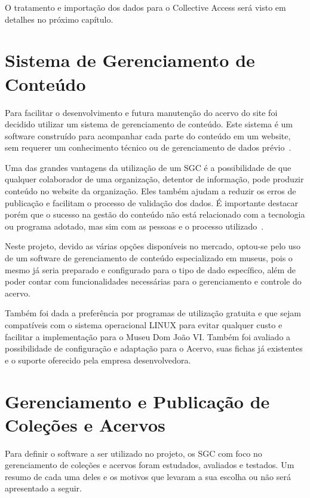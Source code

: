 \documentclass[a4paper,12pt,oneside,onecolumn,final,fleqn]{repUERJ}
\begin{document}
O tratamento e importação dos dados para o Collective Access será visto em detalhes no próximo capítulo.

\section{Sistema de Gerenciamento de Conteúdo}

Para facilitar o desenvolvimento e futura manutenção do acervo do site foi decidido utilizar um sistema de gerenciamento de conteúdo. Este sistema é um software construído para acompanhar cada parte do conteúdo em um website, sem requerer um conhecimento técnico ou de gerenciamento de dados prévio~\cite{CMS}.

Uma das grandes vantagens da utilização de um SGC é a possibilidade de que qualquer colaborador de uma organização, detentor de informação, pode produzir conteúdo no website da organização. Eles também ajudam a reduzir os erros de publicação e facilitam o processo de validação dos dados. É importante destacar porém que o sucesso na gestão do conteúdo não está relacionado com a tecnologia ou programa adotado, mas sim com as pessoas e o processo utilizado~\cite{chagas2018estudo}.


Neste projeto, devido as várias opções disponíveis no mercado, optou-se pelo uso de um software de gerenciamento de conteúdo especializado em museus, pois o mesmo já seria preparado e configurado para o tipo de dado específico, além de poder contar com funcionalidades necessárias para o gerenciamento e controle do acervo.

Também foi dada a preferência por programas de utilização gratuita e que sejam compatíveis com o sistema operacional LINUX para evitar qualquer custo e facilitar a implementação para o Museu Dom João VI. Também foi avaliado a possibilidade de configuração e adaptação para o Acervo, suas fichas já existentes e o suporte oferecido pela empresa desenvolvedora.

\section{Gerenciamento e Publicação de Coleções e Acervos}

Para definir o software a ser utilizado no projeto, os SGC com foco no gerenciamento de coleções e acervos foram estudados, avaliados e testados. Um resumo de cada uma deles e os motivos que levaram a sua escolha ou não será apresentado a seguir.
\end{document}
